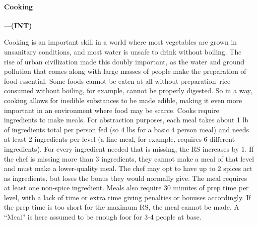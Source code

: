 \documentclass[oneside,11pt,english]{book}
\begin{document}
\paragraph{\label{skill:Cooking}Cooking}---\quad\textbf{(INT) }\par
Cooking is an important skill in a world where most vegetables are grown in unsanitary conditions, and most water is unsafe to drink without boiling. The rise of urban civilization made this doubly important, as the water and ground pollution that comes along with large masses of people make the preparation of food essential. Some foods cannot be eaten at all without preparation--rice consumed without boiling, for example, cannot be properly digested. So in a way, cooking allows for inedible substances to be made edible, making it even more important in an environment where food may be scarce. Cooks require ingredients to make meals. For abstraction purposes, each meal takes about 1 lb of ingredients total per person fed (so 4 lbs for a basic 4 person meal) and needs at least 2 ingredients per level (a fine meal, for example, requires 6 different ingredients). For every ingredient needed that is missing, the RS increases by 1. If the chef is missing more than 3 ingredients, they cannot make a meal of that level and must make a lower-quality meal. The chef may opt to have up to 2 spices act as ingredients, but loses the bonus they would normally give. The meal requires at least one non-spice ingredient. Meals also require 30 minutes of prep time per level, with a lack of time or extra time giving penalties or bonuses accordingly. If the prep time is too short for the maximum RS, the meal cannot be made. A “Meal” is here assumed to be enough foor for 3-4 people at base.
\end{document}
